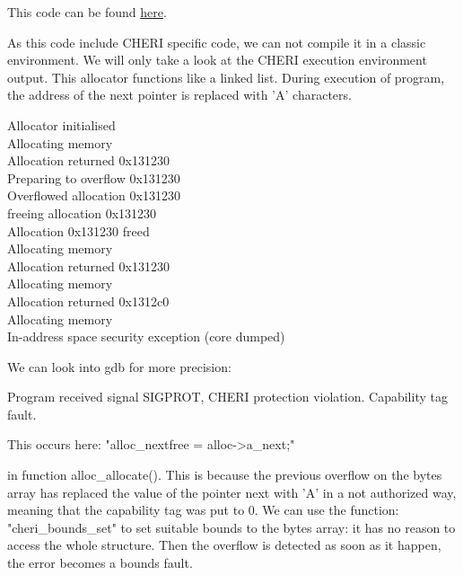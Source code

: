 \documentclass[a4paper, 11pt]{article}
\begin{document}
		

		
		

		This code can be found \href{https://ctsrd-cheri.github.io/cheri-exercises/exercises/cheri-allocator/index.html}{here}.


	
		As this code include CHERI specific code, we can not compile it in a classic environment. We will only take a look at the CHERI execution environment output.
		This allocator functions like a linked list. During execution of program, the address of the next pointer is replaced with 'A' characters.
		\begin{tcolorbox}[colback=gray!5!white, colframe=blue!75!black, title=Output On an environment protected by CHERI]
			Allocator initialised\\
			Allocating memory\\
			Allocation returned 0x131230\\
			Preparing to overflow 0x131230\\
			Overflowed allocation 0x131230\\
			freeing allocation 0x131230\\
			Allocation 0x131230 freed\\
			Allocating memory\\
			Allocation returned 0x131230\\
			Allocating memory\\
			Allocation returned 0x1312c0\\
			Allocating memory\\
			In-address space security exception (core dumped)
		\end{tcolorbox}

		We can look into gdb for more precision:
		\begin{tcolorbox}[colback=gray!5!white, colframe=black!75!black, title=GDB Debug]
			Program received signal SIGPROT, CHERI protection violation.
			Capability tag fault.
		\end{tcolorbox}
		This occurs here: "alloc\_nextfree = alloc->a\_next;"
		

		in function alloc\_allocate().
		This is because the previous overflow on the bytes array has replaced the value of the pointer next with 'A' in a not authorized way, meaning that the capability tag was put to 0.
		We can use the function: "cheri\_bounds\_set" to set suitable bounds to the bytes array: it has no reason to access the whole structure.
		Then the overflow is detected as soon as it happen, the error becomes a bounds fault.
		
\end{document}
